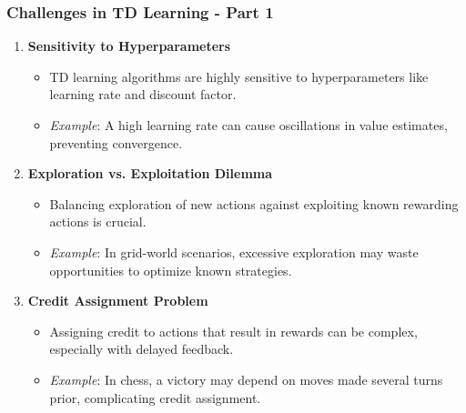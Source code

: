 \documentclass[aspectratio=169]{beamer}
\begin{document}
\begin{frame}[fragile]
    \frametitle{Challenges in TD Learning - Part 1}
    \begin{enumerate}
        \item \textbf{Sensitivity to Hyperparameters}
        \begin{itemize}
            \item TD learning algorithms are highly sensitive to hyperparameters like learning rate and discount factor.
            \item \textit{Example}: A high learning rate can cause oscillations in value estimates, preventing convergence.
        \end{itemize}

        \item \textbf{Exploration vs. Exploitation Dilemma}
        \begin{itemize}
            \item Balancing exploration of new actions against exploiting known rewarding actions is crucial.
            \item \textit{Example}: In grid-world scenarios, excessive exploration may waste opportunities to optimize known strategies.
        \end{itemize}

        \item \textbf{Credit Assignment Problem}
        \begin{itemize}
            \item Assigning credit to actions that result in rewards can be complex, especially with delayed feedback.
            \item \textit{Example}: In chess, a victory may depend on moves made several turns prior, complicating credit assignment.
        \end{itemize}
    \end{enumerate}
\end{frame}
\end{document}
